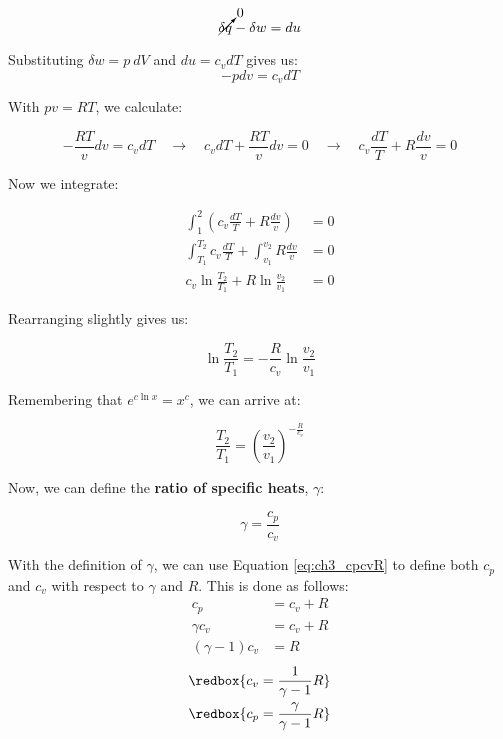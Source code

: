 \begin{equation*}
  \cancelto{0}{\delta q} - \delta w = du
\end{equation*}

Substituting $\delta w = p\: dV$ and $du = c_v dT$ gives us:
\begin{equation*}
  -p dv = c_v dT
\end{equation*}

With $pv = RT$, we calculate:

\begin{equation*}
  -\frac{RT}{v} dv = c_v dT \quad \rightarrow \quad c_v dT + \frac{RT}{v} dv =0 \quad \rightarrow \quad c_v \frac{dT}{T} + R \frac{dv}{v} = 0
\end{equation*}

Now we integrate:

\begin{align*}
  \int_1^2 \left(c_v \frac{dT}{T} + R \frac{dv}{v}\right) &= 0\\
  \int_{T_1}^{T_2} c_v \frac{dT}{T} + \int_{v_1}^{v_2} R \frac{dv}{v} &= 0 \\
  c_v \ln \frac{T_2}{T_1} + R \ln \frac{v_2}{v_1} &= 0
\end{align*}

Rearranging slightly gives us:

\begin{equation} \label{eq:ch3_adiabaticTv}
  \ln \frac{T_2}{T_1} = -\frac{R}{c_v} \ln \frac{v_2}{v_1}
\end{equation}

Remembering that $e^{c \ln x} = x^c$, we can arrive at:

\begin{equation*}
  \frac{T_2}{T_1} = \left(\frac{v_2}{v_1}\right)^{-\frac{R}{c_v}}
\end{equation*}

Now, we can define the {\bf ratio of specific heats}, $\gamma$:

\begin{equation} \label{eq:ch3_gammadef}
  \gamma = \frac{c_p}{c_v}
\end{equation}

With the definition of $\gamma$, we can use Equation \ref{eq:ch3_cpcvR}  to define both $c_p$ and $c_v$ with respect to $\gamma$ and $R$.  This is done as follows:
\begin{align}
  \nonumber c_p &= c_v + R\\
  \nonumber \gamma c_v &= c_v + R\\
  \nonumber \left(\gamma - 1\right) c_v &= R
\end{align}
\begin{align}
  \label{eq:ch3_cvgammaR} \redbox{c_v = \frac{1}{\gamma - 1} R} \\
  \label{eq:ch3_cpgammaR} \redbox{c_p = \frac{\gamma}{\gamma -1} R}
\end{align}

